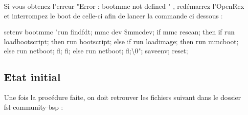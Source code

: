 Si vous obtenez l’erreur "Error : bootmmc not defined " , redémarrez l’OpenRex et interrompez le boot de celle-ci afin de lancer la commande ci dessous :

\begin{tcolorbox}
	setenv bootmmc "run findfdt; mmc dev \${mmcdev}; if mmc rescan; then if run loadbootscript;
	then run bootscript; else if run loadimage; then run mmcboot; else run netboot;
	fi; fi; else run netboot; fi;\textbackslash0"; saveenv; reset;
\end{tcolorbox}

\subsection{Etat initial}

Une fois la procédure faite, on doit retrouver les fichiers suivant dans le
dossier fsl-community-bsp :
